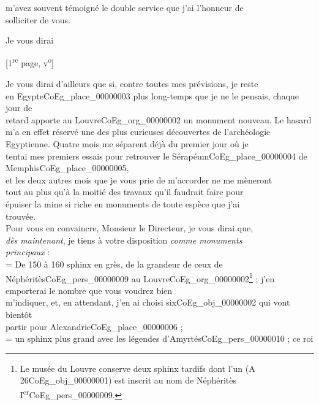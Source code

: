 \documentclass{book}
\begin{document}
m’avez souvent témoigné le double service que j’ai l’honneur de\\
solliciter de vous.
\begin{flushright}Je vous dirai\end{flushright}
{\footnotesize \begin{center} {[1\textsuperscript{re} page, v\textsuperscript{o}]}\end{center}}
\indent Je vous dirai d’ailleurs que si, contre toutes mes prévisions, je reste\\
en Egypte\gls{CoEg_place_00000003} plus long-temps que je ne le pensais, chaque jour de\\
retard apporte au Louvre\gls{CoEg_org_00000002} un monument nouveau. Le hasard\\
m’a en effet réservé une des plus curieuses découvertes de l’archéologie\\
Egyptienne. Quatre mois me séparent déjà du premier jour où je\\
tentai mes premiers essais pour retrouver le Sérapéum\gls{CoEg_place_00000004} de Memphis\gls{CoEg_place_00000005},\\
et les deux autres mois que je vous prie de m’accorder ne me mèneront\\
tout au plus qu’à la moitié des travaux qu’il faudrait faire pour\\
épuiser la mine si riche en monuments de toute espèce que j’ai\\
trouvée.\\
\indent Pour vous en convaincre, Monsieur le Directeur, je vous dirai que,\\
\textit{dès maintenant}, je tiens à votre disposition \textit{comme monuments\\
principaux} :\\
 = De 150 à 160 sphinx en grès, de la grandeur de ceux de\\
Néphéritès\gls{CoEg_pers_00000009} au Louvre\gls{CoEg_org_00000002}\footnote{Le musée du Louvre conserve deux sphinx tardifs dont l'un (A 26\gls{CoEg_obj_00000001}) est inscrit au nom de Néphéritès I\textsuperscript{er}\gls{CoEg_pers_00000009}.} ; j’en emporterai le nombre que vous voudrez bien\\
m’indiquer, et, en attendant, j’en ai choisi six\gls{CoEg_obj_00000002} qui vont bientôt\\
partir pour Alexandrie\gls{CoEg_place_00000006} ;\\
 = un sphinx plus grand avec les légendes d’Amyrtés\gls{CoEg_pers_00000010} ; ce roi\\
\end{document}
